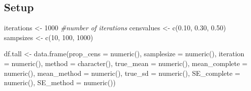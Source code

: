 \documentclass[12pt, twoside]{amherstthesis}
\newenvironment{Shaded}{\begin{snugshade}}{\end{snugshade}}
\newcommand{\AttributeTok}[1]{\textcolor[rgb]{0.77,0.63,0.00}{#1}}
\newcommand{\CommentTok}[1]{\textcolor[rgb]{0.56,0.35,0.01}{\textit{#1}}}
\newcommand{\ConstantTok}[1]{\textcolor[rgb]{0.00,0.00,0.00}{#1}}
\newcommand{\DecValTok}[1]{\textcolor[rgb]{0.00,0.00,0.81}{#1}}
\newcommand{\FloatTok}[1]{\textcolor[rgb]{0.00,0.00,0.81}{#1}}
\newcommand{\FunctionTok}[1]{\textcolor[rgb]{0.00,0.00,0.00}{#1}}
\newcommand{\NormalTok}[1]{#1}
\newcommand{\OtherTok}[1]{\textcolor[rgb]{0.56,0.35,0.01}{#1}}
\newcommand{\SpecialCharTok}[1]{\textcolor[rgb]{0.00,0.00,0.00}{#1}}
\newcommand{\StringTok}[1]{\textcolor[rgb]{0.31,0.60,0.02}{#1}}
\begin{document}
\begin{Shaded}
\end{Shaded}
\hypertarget{setup}{%
\subsection{Setup}\label{setup}}
\begin{Shaded}
\begin{Highlighting}[]
\NormalTok{iterations }\OtherTok{\textless{}{-}} \DecValTok{1000} \CommentTok{\#number of iterations}
\NormalTok{censvalues }\OtherTok{\textless{}{-}} \FunctionTok{c}\NormalTok{(}\FloatTok{0.10}\NormalTok{, }\FloatTok{0.30}\NormalTok{, }\FloatTok{0.50}\NormalTok{)}
\NormalTok{sampsizes }\OtherTok{\textless{}{-}} \FunctionTok{c}\NormalTok{(}\DecValTok{10}\NormalTok{, }\DecValTok{100}\NormalTok{, }\DecValTok{1000}\NormalTok{)}

\NormalTok{df.tall }\OtherTok{\textless{}{-}} \FunctionTok{data.frame}\NormalTok{(}\AttributeTok{prop\_cens =} \FunctionTok{numeric}\NormalTok{(),}
                      \AttributeTok{samplesize =} \FunctionTok{numeric}\NormalTok{(),}
                      \AttributeTok{iteration =} \FunctionTok{numeric}\NormalTok{(),}
                      \AttributeTok{method =} \FunctionTok{character}\NormalTok{(),}
                      \AttributeTok{true\_mean =} \FunctionTok{numeric}\NormalTok{(),}
                      \AttributeTok{mean\_complete =} \FunctionTok{numeric}\NormalTok{(),}
                      \AttributeTok{mean\_method =} \FunctionTok{numeric}\NormalTok{(),}
                      \AttributeTok{true\_sd =} \FunctionTok{numeric}\NormalTok{(),}
                      \AttributeTok{SE\_complete =} \FunctionTok{numeric}\NormalTok{(),}
                      \AttributeTok{SE\_method =} \FunctionTok{numeric}\NormalTok{())}
\end{Highlighting}
\end{Shaded}
\end{document}
